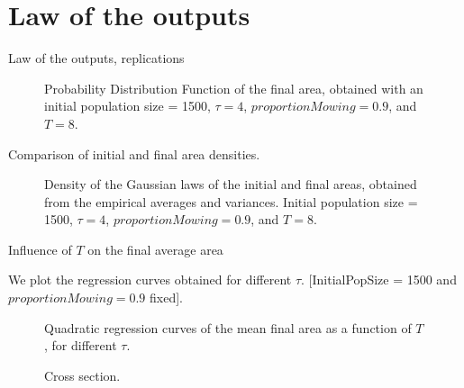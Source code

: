 \documentclass{myBeamer}
\begin{document}
\section*{Law of the outputs}
\begin{frame}{Law of the outputs, replications}
\begin{figure}[H] 
\caption{\footnotesize Probability Distribution Function of the final area, obtained with an initial population size = 1500, $\tau = 4$,  $proportionMowing = 0.9$, and $T=8$.}
\end{figure}
\end{frame}





\begin{frame}{Comparison of initial and final area densities.}
\begin{figure}[H] 
\caption{\footnotesize Density of the Gaussian laws of the initial and final areas, obtained from the empirical averages and variances. Initial population size = 1500, $\tau = 4$,  $proportionMowing = 0.9$, and $T=8$.}
\end{figure}
\end{frame}






\begin{frame}{Influence of $T$ on the final average area}
\begin{minipage}{0.75\linewidth}
\small{We plot the regression curves obtained for different $\tau$. [InitialPopSize = 1500 and $proportionMowing = 0.9$ fixed].}
\begin{figure}[H] 
\caption{\footnotesize Quadratic regression curves  of the mean final area as a function of $T$, for different $\tau$.}
\end{figure}
\end{minipage}
\begin{minipage}{0.20\linewidth}
\bigbreak \bigbreak 
\begin{figure}[H] 
\caption{\footnotesize Cross section.}
\end{figure}
\end{minipage}
\end{frame}
\end{document}
